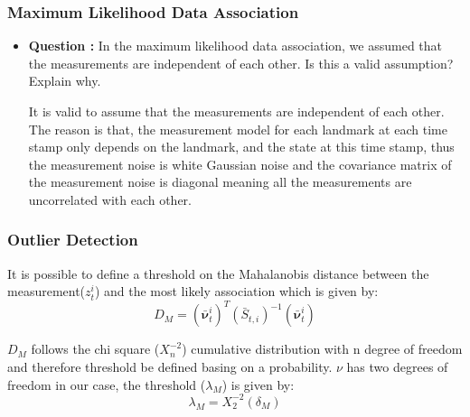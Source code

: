\documentclass[11pt,a4paper]{article}
\begin{document}
\subsubsection{Maximum Likelihood Data Association}
\begin{itemize}
	\item \addtocounter{cnt_questions}{1} \textbf{Question :} In the maximum likelihood data association, we assumed that the measurements are independent of each other. Is this a valid assumption? Explain why.
		\par It is valid to assume that the measurements are independent of each other. The reason is that, the measurement model for each landmark at each time stamp only depends on the landmark, and the state at this time stamp, thus the measurement noise is white Gaussian noise and the covariance matrix of the measurement noise is diagonal meaning all the measurements are uncorrelated with each other.
\end{itemize}

\subsubsection{Outlier Detection}
\par It is possible to define a threshold on the Mahalanobis distance between the measurement($z^i_t$) and the most likely association which is given by:
\begin{equation}
	D_{M} = (\boldsymbol{\bar\nu}^i_t)^T(\bar S_{t,i})^{-1}(\boldsymbol{\bar\nu}^i_t)
	\label{eq:mahalanobis}
\end{equation}
\par $D_M$ follows the chi square ($X^{-2}_n$) cumulative distribution with n degree of freedom and therefore threshold be defined basing on a probability. $\nu$ has two degrees of freedom in our case, the threshold ($\lambda_M$) is given by:
\begin{equation}
	\lambda_M = X^{-2}_2(\delta_M)
	\label{eq:lambda}
\end{equation}
\end{document}
